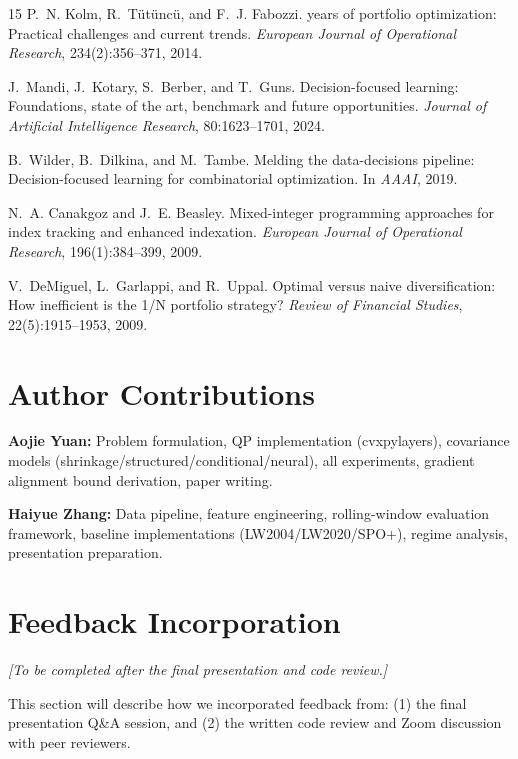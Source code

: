 \documentclass[11pt]{article}
\begin{document}
\begin{thebibliography}{15}
P.~N. Kolm, R.~T{\"u}t{\"u}nc{\"u}, and F.~J. Fabozzi.
 years of portfolio optimization: Practical challenges and current trends.
\newblock \emph{European Journal of Operational Research}, 234(2):356--371, 2014.

J.~Mandi, J.~Kotary, S.~Berber, and T.~Guns.
\newblock Decision-focused learning: Foundations, state of the art, benchmark and future opportunities.
\newblock \emph{Journal of Artificial Intelligence Research}, 80:1623--1701, 2024.

B.~Wilder, B.~Dilkina, and M.~Tambe.
\newblock Melding the data-decisions pipeline: Decision-focused learning for combinatorial optimization.
\newblock In \emph{AAAI}, 2019.

N.~A. Canakgoz and J.~E. Beasley.
\newblock Mixed-integer programming approaches for index tracking and enhanced indexation.
\newblock \emph{European Journal of Operational Research}, 196(1):384--399, 2009.

V.~DeMiguel, L.~Garlappi, and R.~Uppal.
\newblock Optimal versus naive diversification: How inefficient is the 1/N portfolio strategy?
\newblock \emph{Review of Financial Studies}, 22(5):1915--1953, 2009.

\end{thebibliography}

\section{Author Contributions}
\label{sec:contributions}

\textbf{Aojie Yuan:} Problem formulation, QP implementation (cvxpylayers), covariance models (shrinkage/structured/conditional/neural), all experiments, gradient alignment bound derivation, paper writing.

\textbf{Haiyue Zhang:} Data pipeline, feature engineering, rolling-window evaluation framework, baseline implementations (LW2004/LW2020/SPO+), regime analysis, presentation preparation.

\section{Feedback Incorporation}
\label{sec:feedback}

\textit{[To be completed after the final presentation and code review.]}

This section will describe how we incorporated feedback from: (1) the final presentation Q\&A session, and (2) the written code review and Zoom discussion with peer reviewers.
\end{document}
